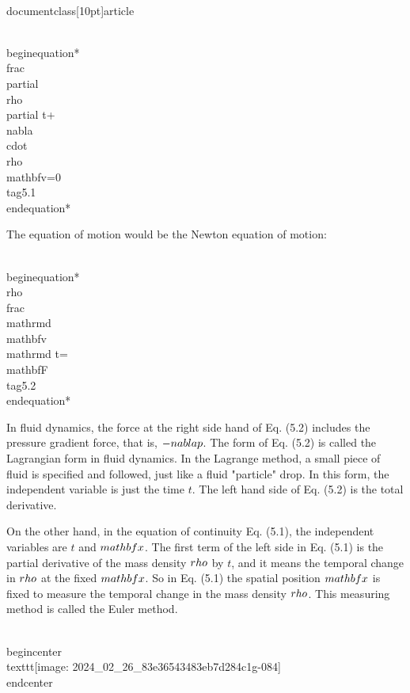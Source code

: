 \\documentclass[10pt]{article}
\begin{document}
\\begin{equation*}
\\frac{\\partial \\rho}{\\partial t}+\\nabla \\cdot \\rho \\mathbf{v}=0 \\tag{5.1}
\\end{equation*}


The equation of motion would be the Newton equation of motion:


\\begin{equation*}
\\rho \\frac{\\mathrm{d} \\mathbf{v}}{\\mathrm{d} t}=\\mathbf{F} \\tag{5.2}
\\end{equation*}


In fluid dynamics, the force at the right side hand of Eq. (5.2) includes the pressure gradient force, that is, $-\\nabla p$. The form of Eq. (5.2) is called the Lagrangian form in fluid dynamics. In the Lagrange method, a small piece of fluid is specified and followed, just like a fluid "particle" drop. In this form, the independent variable is just the time $t$. The left hand side of Eq. (5.2) is the total derivative.

On the other hand, in the equation of continuity Eq. (5.1), the independent variables are $t$ and $\\mathbf{x}$. The first term of the left side in Eq. (5.1) is the partial derivative of the mass density $\\rho$ by $t$, and it means the temporal change in $\\rho$ at the fixed $\\mathbf{x}$. So in Eq. (5.1) the spatial position $\\mathbf{x}$ is fixed to measure the temporal change in the mass density $\\rho$. This measuring method is called the Euler method.

\\begin{center}
\\texttt{[image: 2024\_02\_26\_83e36543483eb7d284c1g-084]}
\\end{center}
\end{document}
